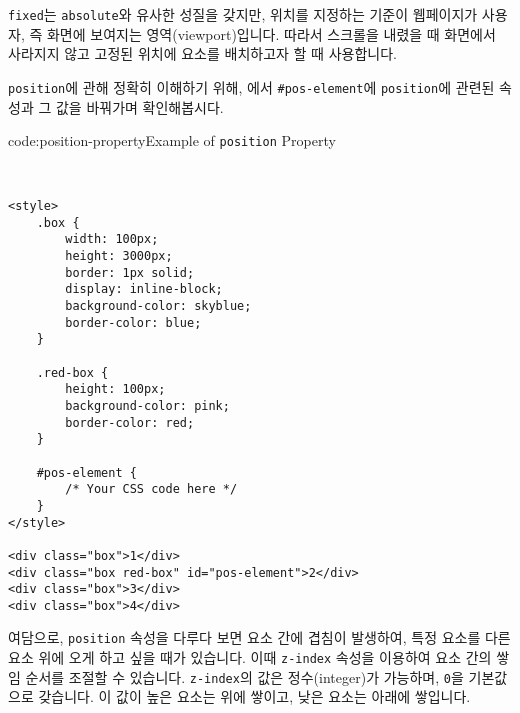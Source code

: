 \verb|fixed|는 \verb|absolute|와 유사한 성질을 갖지만, 위치를 지정하는 기준이 웹페이지가 사용자, 즉 화면에 보여지는 영역(viewport)입니다. 따라서 스크롤을 내렸을 때 화면에서 사라지지 않고 고정된 위치에 요소를 배치하고자 할 때 사용합니다. 

\verb|position|에 관해 정확히 이해하기 위해, 에서 \verb|#pos-element|에 \verb|position|에 관련된 속성과 그 값을 바꿔가며 확인해봅시다. 

\begin{codeenv}{code:position-property}{Example of \texttt{position} Property}\begin{verbatim}


<style>
    .box {
        width: 100px;
        height: 3000px;
        border: 1px solid;
        display: inline-block;
        background-color: skyblue;
        border-color: blue;
    }

    .red-box {
        height: 100px;
        background-color: pink;
        border-color: red;
    }

    #pos-element {
        /* Your CSS code here */
    }
</style>

<div class="box">1</div>
<div class="box red-box" id="pos-element">2</div>
<div class="box">3</div>
<div class="box">4</div>
\end{verbatim}
\end{codeenv}

여담으로, \verb|position| 속성을 다루다 보면 요소 간에 겹침이 발생하여, 특정 요소를 다른 요소 위에 오게 하고 싶을 때가 있습니다. 이때 \verb|z-index| 속성을 이용하여 요소 간의 쌓임 순서를 조절할 수 있습니다. \verb|z-index|의 값은 정수(integer)가 가능하며, \verb|0|을 기본값으로 갖습니다. 이 값이 높은 요소는 위에 쌓이고, 낮은 요소는 아래에 쌓입니다. 
